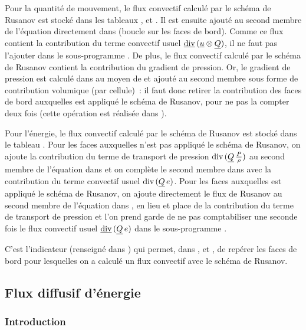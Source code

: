 Pour la quantité de mouvement, le flux convectif calculé par le schéma de
Rusanov  est stocké dans les tableaux
,  et
. Il est ensuite ajouté au second membre de
l'équation directement dans  (boucle sur les faces de bord).
Comme ce flux contient la contribution du terme convectif usuel
$\underline{\text{div}}\,(\underline{u}\otimes\underline{Q})$, il ne faut pas l'ajouter dans
le sous-programme .
De plus, le flux convectif calculé par le schéma de Rusanov
contient la contribution du
gradient de pression. Or, le gradient de pression est calculé dans
 au moyen de  et ajouté au second membre
sous forme de contribution volumique (par cellule)~: il faut donc retirer
la contribution des faces de bord auxquelles est appliqué le schéma de
Rusanov, pour ne pas la compter deux fois (cette opération est réalisée
dans ).

Pour l'énergie, le flux convectif calculé par le schéma de
Rusanov est stocké dans le tableau
. Pour les faces auxquelles n'est pas
appliqué le schéma de Rusanov, on ajoute la contribution
du terme de transport de pression $\text{div}\,(\underline{Q}\,\frac{P}{\rho})$
au second membre de l'équation dans 
et on complète le second membre dans  avec la contribution du
terme convectif usuel $\text{div}\,(\underline{Q}\,e)$. Pour les faces auxquelles est
appliqué le schéma de Rusanov, on ajoute directement le flux de Rusanov au second
membre de l'équation dans , en lieu et place de la contribution
du terme de transport de pression et l'on prend garde de ne pas
comptabiliser une seconde fois le flux convectif usuel
$\underline{\text{div}}\,(\underline{Q}\,e)$ dans le sous-programme .

C'est l'indicateur 
(renseigné dans ) qui permet, dans ,
 et ,
de repérer les faces de bord pour lesquelles on a calculé
un flux convectif avec le schéma de Rusanov.


\subsection*{Flux diffusif d'énergie}

\subsubsection*{Introduction}

